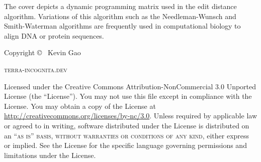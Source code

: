 \documentclass[11pt,fleqn,dvipsnames]{book} %
\begin{document}




\newpage
The cover depicts a dynamic programming matrix used in the edit distance algorithm. Variations of this algorithm such as the Needleman-Wunsch and Smith-Waterman algorithms are frequently used in computational biology to align DNA or protein sequences.
~\vfill
\thispagestyle{empty}

\noindent Copyright \copyright\ \the\year{} Kevin Gao %

\hfill

\noindent \textsc{terra-incognita.dev} %

\hfill

\noindent Licensed under the Creative Commons Attribution-NonCommercial 3.0 Unported License (the ``License''). You may not use this file except in compliance with the License. You may obtain a copy of the License at \url{http://creativecommons.org/licenses/by-nc/3.0}. Unless required by applicable law or agreed to in writing, software distributed under the License is distributed on an \textsc{``as is'' basis, without warranties or conditions of any kind}, either express or implied. See the License for the specific language governing permissions and limitations under the License.





\pagestyle{empty} %
\usechapterimagefalse
\tableofcontents %

\cleardoublepage %
\end{document}
